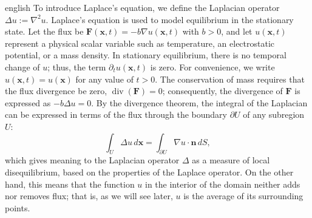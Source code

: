 \documentclass[11pt,letterpaper,twoside,openright]{book} %
\begin{document}
\begin{hyphenrules}{english}
To introduce Laplace's equation, we define the Laplacian operator $\Delta u:=\nabla^2u$. Laplace's
equation is used to model equilibrium in the stationary state. Let
the flux be $\mathbf{F}(\mathbf{x},t)=-b\nabla u(\mathbf{x},t)$ with $b>0$, and let $u(\mathbf{x},t)$ represent a physical scalar
variable such as temperature, an electrostatic potential, or a mass density. In stationary equilibrium,
there is no temporal change of $u$; thus, the term $\partial_t u(\mathbf{x},t)$ is zero. For convenience, we
write $u(\mathbf{x},t)=u(\mathbf{x})$ for any value of $t>0$.
The conservation of mass requires that the flux divergence be zero, $\operatorname{div}(\mathbf{F})=0$;
consequently, the divergence of $\mathbf{F}$ is expressed as $-b\Delta u=0$. By the divergence theorem, the
integral of the Laplacian can be expressed in terms of the flux through the boundary $\partial U$ of any
subregion $U$:
\begin{equation}
  \int_U\Delta u\,d\mathbf{x}=\int_{\partial U}\nabla u\cdot\mathbf{n}\,d S,
  \label{eq:laplace-flux}
\end{equation}
which gives meaning to the Laplacian operator $\Delta$ as a measure of local disequilibrium, based on the properties of the Laplace operator. On the other hand, this means that the function $u$ in the interior of the domain neither adds nor removes flux;
that is, as we will see later, $u$ is the average of its surrounding points.


\end{hyphenrules}
\end{document}
